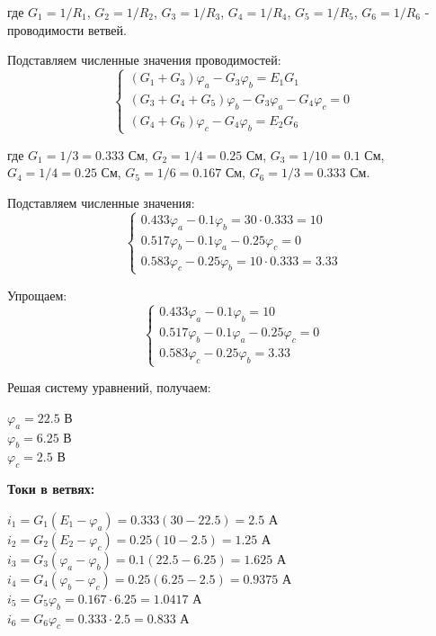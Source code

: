 где $G_1 = 1/R_1$, $G_2 = 1/R_2$, $G_3 = 1/R_3$, $G_4 = 1/R_4$, $G_5 = 1/R_5$, $G_6 = 1/R_6$ - проводимости ветвей.

Подставляем численные значения проводимостей:
$$\begin{cases}
(G_1 + G_3)\varphi_a - G_3\varphi_b = E_1 G_1 \\
(G_3 + G_4 + G_5)\varphi_b - G_3\varphi_a - G_4\varphi_c = 0 \\
(G_4 + G_6)\varphi_c - G_4\varphi_b = E_2 G_6
\end{cases}$$

где $G_1 = 1/3 = 0.333$ См, $G_2 = 1/4 = 0.25$ См, $G_3 = 1/10 = 0.1$ См, $G_4 = 1/4 = 0.25$ См, $G_5 = 1/6 = 0.167$ См, $G_6 = 1/3 = 0.333$ См.

Подставляем численные значения:
$$\begin{cases}
0.433\varphi_a - 0.1\varphi_b = 30 \cdot 0.333 = 10 \\
0.517\varphi_b - 0.1\varphi_a - 0.25\varphi_c = 0 \\
0.583\varphi_c - 0.25\varphi_b = 10 \cdot 0.333 = 3.33
\end{cases}$$

Упрощаем:
$$\begin{cases}
0.433\varphi_a - 0.1\varphi_b = 10 \\
0.517\varphi_b - 0.1\varphi_a - 0.25\varphi_c = 0 \\
0.583\varphi_c - 0.25\varphi_b = 3.33
\end{cases}$$

Решая систему уравнений, получаем:
\begin{flushleft}
$\varphi_a = 22.5$ В \\
$\varphi_b = 6.25$ В \\
$\varphi_c = 2.5$ В
\end{flushleft}

\textbf{Токи в ветвях:}
\begin{flushleft}
$i_1 = G_1(E_1 - \varphi_a) = 0.333(30 - 22.5) = 2.5$ А \\
$i_2 = G_2(E_2 - \varphi_c) = 0.25(10 - 2.5) = 1.25$ А \\
$i_3 = G_3(\varphi_a - \varphi_b) = 0.1(22.5 - 6.25) = 1.625$ А \\
$i_4 = G_4(\varphi_b - \varphi_c) = 0.25(6.25 - 2.5) = 0.9375$ А \\
$i_5 = G_5\varphi_b = 0.167 \cdot 6.25 = 1.0417$ А \\
$i_6 = G_6\varphi_c = 0.333 \cdot 2.5 = 0.833$ А
\end{flushleft}

